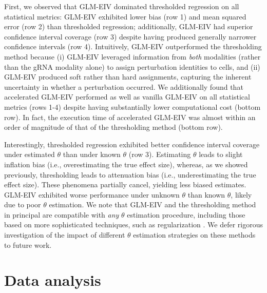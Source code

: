 \documentclass[11pt]{article}
\begin{document}
First, we observed that GLM-EIV dominated thresholded regression on all statistical metrics: GLM-EIV exhibited lower bias (row 1) and mean squared error (row 2) than thresholded regression; additionally, GLM-EIV had superior confidence interval coverage (row 3) despite having produced generally narrower confidence intervals (row 4). Intuitively, GLM-EIV outperformed the thresholding method because (i) GLM-EIV leveraged information from \textit{both} modalities (rather than the gRNA modality alone) to assign perturbation identities to cells, and (ii) GLM-EIV produced soft rather than hard assignments, capturing the inherent uncertainty in whether a perturbation occurred. We additionally found that accelerated GLM-EIV performed as well as vanilla GLM-EIV on all statistical metrics (rows 1-4) despite having substantially lower computational cost (bottom row). In fact, the execution time of accelerated GLM-EIV was almost within an order of magnitude of that of the thresholding method (bottom row).

Interestingly, thresholded regression exhibited better confidence interval coverage under estimated $\theta$ than under known $\theta$ (row 3). Estimating $\theta$ leads to slight inflation bias (i.e., overestimating the true effect size), whereas, as we showed previously, thresholding leads to attenuation bias (i.e., underestimating the true effect size). These phenomena partially cancel, yielding less biased estimates. GLM-EIV exhibited worse performance under unknown $\theta$ than known $\theta$, likely due to poor $\theta$ estimation. We note that GLM-EIV and the thresholding method in principal are compatible with \textit{any} $\theta$ estimation procedure, including those based on more sophisticated techniques, such as regularization \cite{Hafemeister2019}. We defer rigorous investigation of the impact of different $\theta$ estimation strategies on these methods to future work.

\section{Data analysis}
\end{document}
